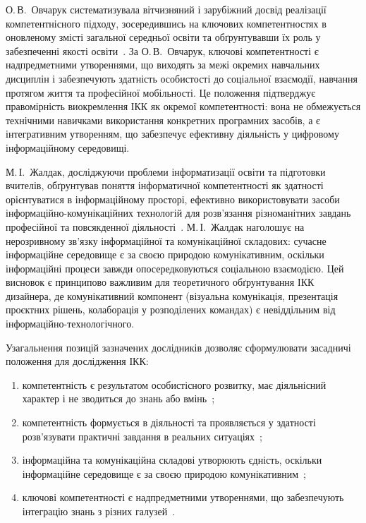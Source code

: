 О.\,В.~Овчарук систематизувала вітчизняний і зарубіжний досвід реалізації компетентнісного підходу, зосередившись на ключових компетентностях в оновленому змісті загальної середньої освіти та обґрунтувавши їх роль у забезпеченні якості освіти~\cite{Ovcharuk2004Competency}. За О.\,В.~Овчарук, ключові компетентності є надпредметними утвореннями, що виходять за межі окремих навчальних дисциплін і забезпечують здатність особистості до соціальної взаємодії, навчання протягом життя та професійної мобільності. Це положення підтверджує правомірність виокремлення ІКК як окремої компетентності: вона не обмежується технічними навичками використання конкретних програмних засобів, а є інтегративним утворенням, що забезпечує ефективну діяльність у цифровому інформаційному середовищі.

М.\,І.~Жалдак, досліджуючи проблеми інформатизації освіти та підготовки вчителів, обґрунтував поняття інформатичної компетентності як здатності орієнтуватися в інформаційному просторі, ефективно використовувати засоби інформаційно-комунікаційних технологій для розв'язання різноманітних завдань професійної та повсякденної діяльності~\cite{Zhaldak2005Competency}. М.\,І.~Жалдак наголошує на нерозривному зв'язку інформаційної та комунікаційної складових: сучасне інформаційне середовище є за своєю природою комунікативним, оскільки інформаційні процеси завжди опосередковуються соціальною взаємодією. Цей висновок є принципово важливим для теоретичного обґрунтування ІКК дизайнера, де комунікативний компонент (візуальна комунікація, презентація проєктних рішень, колаборація у розподілених командах) є невіддільним від інформаційно-технологічного.

Узагальнення позицій зазначених дослідників дозволяє сформулювати засадничі положення для дослідження ІКК:
\begin{enumerate}
    \item компетентність є результатом особистісного розвитку, має діяльнісний характер і не зводиться до знань або вмінь~\cite{Lokshyna2014Competency, Pometun2004Competency};
    \item компетентність формується в діяльності та проявляється у здатності розв'язувати практичні завдання в реальних ситуаціях~\cite{Bibik2004Competency, Ovcharuk2004Competency};
    \item інформаційна та комунікаційна складові утворюють єдність, оскільки інформаційне середовище є за своєю природою комунікативним~\cite{Zhaldak2005Competency};
    \item ключові компетентності є надпредметними утвореннями, що забезпечують інтеграцію знань з різних галузей~\cite{Ovcharuk2004Competency}.
\end{enumerate}

